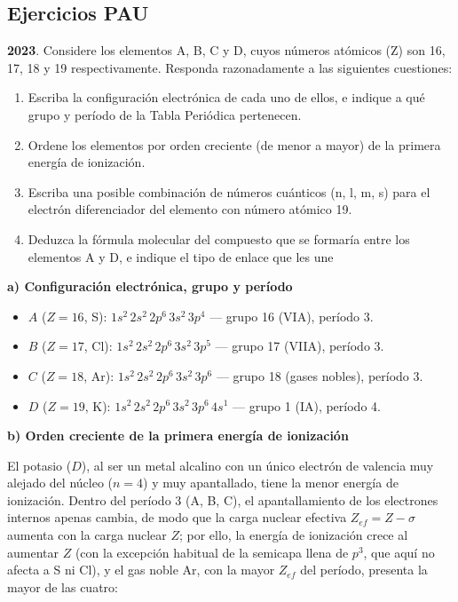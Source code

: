 \subsection{Ejercicios PAU}

\begin{exerciseEVAU}
    \textbf{2023}.
    Considere los elementos A, B, C y D, cuyos números atómicos (Z) son 16, 17, 18 y 19 respectivamente.
    Responda razonadamente a las siguientes cuestiones:
    \begin{enumerate}[label=\letraminuscula]
        \item Escriba la configuración electrónica de cada uno de ellos, e indique a qué grupo y período de
        la Tabla Periódica pertenecen.
        \item Ordene los elementos por orden creciente (de menor a mayor) de la primera energía de
        ionización.
        \item Escriba una posible combinación de números cuánticos (n, l, m, s) para el electrón
        diferenciador del elemento con número atómico 19.
        \item Deduzca la fórmula molecular del compuesto que se formaría entre los elementos A y D, e
        indique el tipo de enlace que les une
    \end{enumerate}
    \begin{solu}

        \textbf{a) Configuración electrónica, grupo y período}

        \begin{itemize}
            \item \(A\) (\(Z=16\), S): \(1s^2\,2s^2\,2p^6\,3s^2\,3p^4\) — grupo 16 (VIA), período 3.
            \item \(B\) (\(Z=17\), Cl): \(1s^2\,2s^2\,2p^6\,3s^2\,3p^5\) — grupo 17 (VIIA), período 3.
            \item \(C\) (\(Z=18\), Ar): \(1s^2\,2s^2\,2p^6\,3s^2\,3p^6\) — grupo 18 (gases nobles), período 3.
            \item \(D\) (\(Z=19\), K): \(1s^2\,2s^2\,2p^6\,3s^2\,3p^6\,4s^1\) — grupo 1 (IA), período 4.
        \end{itemize}

        \textbf{b) Orden creciente de la primera energía de ionización}

        El potasio (\(D\)), al ser un metal alcalino con un único electrón de valencia muy alejado del núcleo (\(n=4\)) y muy apantallado, tiene la menor energía de ionización. Dentro del período 3 (A, B, C), el apantallamiento de los electrones internos apenas cambia, de modo que la carga nuclear efectiva \(Z_{ef} = Z - \sigma\) aumenta con la carga nuclear \(Z\); por ello, la energía de ionización crece al aumentar \(Z\) (con la excepción habitual de la semicapa llena de \(p^3\), que aquí no afecta a S ni Cl), y el gas noble Ar, con la mayor \(Z_{ef}\) del período, presenta la mayor de las cuatro:


\end{solu}
\end{exerciseEVAU}
